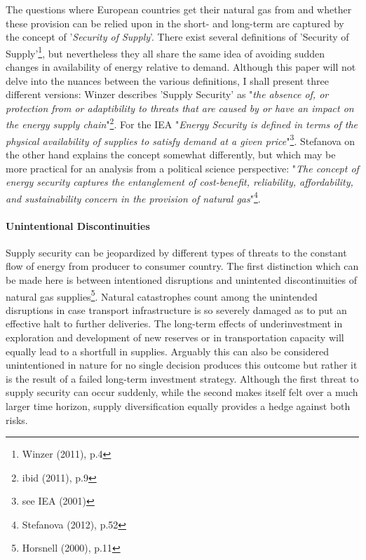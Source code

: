\documentclass[11pt,a4paper,english]{scrreprt}
\begin{document}
The questions where European countries get their natural gas from and whether
these provision can be relied upon in the short- and long-term are captured by
the concept of '\emph{Security of Supply}'. There exist several definitions of
'Security of Supply'\footnote{Winzer (2011), p.4}, but nevertheless they all
share the same idea of avoiding sudden changes in availability of energy
relative to demand. Although this paper will not delve into the nuances between
the various definitions, I shall present three different versions: Winzer
describes 'Supply Security' as "\textsl{the absence of, or protection from or
adaptibility to threats that are caused by or have an impact on the energy
supply chain}"\footnote{ibid (2011), p.9}. For the IEA "\textsl{Energy Security
is defined in terms of the physical availability of supplies to satisfy demand
at a given price}"\footnote{see IEA (2001)}. Stefanova on the other hand
explains the concept somewhat differently, but which may be more practical for
an analysis from a political science perspective: "\textsl{The concept of energy
security captures the entanglement of cost-benefit, reliability, affordability,
and sustainability concern in the provision of natural gas}"\footnote{Stefanova
(2012), p.52}.\par


	\paragraph{Unintentional Discontinuities}

Supply security can be jeopardized by different types of threats to the
constant flow of energy from producer to consumer country. The first
distinction which can be made here is between intentioned disruptions and
unintented discontinuities of natural gas supplies\footnote{Horsnell (2000),
p.11}. Natural catastrophes count among the unintended disruptions in case
transport infrastructure is so severely damaged as to put an effective halt to
further deliveries. The long-term effects of underinvestment in exploration and
development of new reserves or in transportation capacity will equally lead to a
shortfull in supplies. Arguably this can also be considered unintentioned in
nature for no single decision produces this outcome but rather it is the result
of a failed long-term investment strategy. Although the first threat to supply
security can occur suddenly, while the second makes itself felt over a much
larger time horizon, supply diversification equally provides a hedge against
both risks.\par
\end{document}
